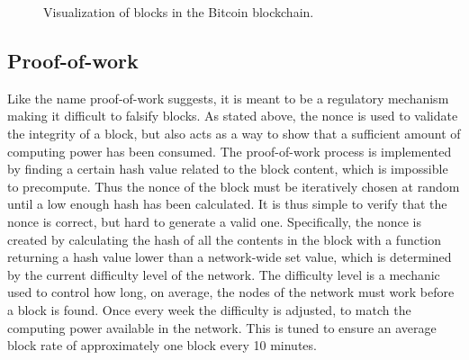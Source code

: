 \begin{figure}[h]
\centering
{}
\caption{Visualization of blocks in the Bitcoin blockchain.}
\label{blockchain}
\end{figure}

\subsection{Proof-of-work}
Like the name proof-of-work suggests, it is meant to be a regulatory mechanism making it difficult to falsify blocks. As stated above, the nonce is used to validate the integrity of a block, but also acts as a way to show that a sufficient amount of computing power has been consumed. The proof-of-work process is implemented by finding a certain hash value related to the block content, which is impossible to precompute. Thus the nonce of the block must be iteratively chosen at random until a low enough hash has been calculated. It is thus simple to verify that the nonce is correct, but hard to generate a valid one. Specifically, the nonce is created by calculating the hash of all the contents in the block with a function returning a hash value lower than a network-wide set value, which is determined by the current difficulty level of the network. The difficulty level is a mechanic used to control how long, on average, the nodes of the network must work before a block is found. Once every week the difficulty is adjusted, to match the computing power available in the network. This is tuned to ensure an average block rate of approximately one block every 10 minutes. 


